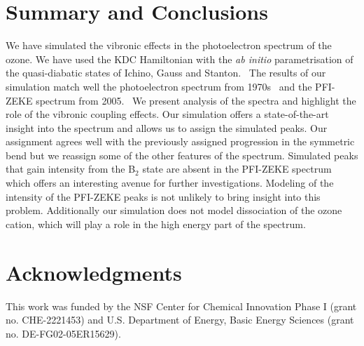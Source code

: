 \documentclass[12pt,prb,aps]{revtex4-2}
\begin{document}
\section{Summary and Conclusions} 

We have simulated the vibronic effects in the photoelectron spectrum of the
ozone.  We have used the KDC Hamiltonian\cite{Cederbaum:LVC:84, KDC:81,
Koppel:CIbookCh7:04} with the \emph{ab initio} parametrisation of the
quasi-diabatic states of Ichino, Gauss and Stanton.~\cite{Stanton:EOMIPdeg:09}
The results of our simulation match well the photoelectron spectrum from
1970s~\cite{dyke:O3:74} and the PFI-ZEKE spectrum from
2005.~\cite{Willitsch:O3ZEKE:2005} We present analysis of the spectra and
highlight the role of the vibronic coupling effects. Our simulation offers a
state-of-the-art insight into the spectrum and allows us to assign the
simulated peaks. Our assignment agrees well with the previously assigned
progression in the symmetric bend but we reassign some of the other features
of the spectrum. Simulated peaks that gain intensity from the B$_2$ state are
absent in the PFI-ZEKE spectrum which offers an interesting avenue for further
investigations. Modeling of the intensity of the PFI-ZEKE peaks is not
unlikely to bring insight into this problem.  Additionally our simulation does
not model dissociation of the ozone cation, which will play a role in the high
energy part of the spectrum.

\section{Acknowledgments} 

This work was funded by the NSF Center for Chemical Innovation Phase I (grant
no. CHE-2221453) and U.S. Department of Energy, Basic Energy Sciences (grant
no. DE-FG02-05ER15629).

\clearpage



\end{document}
